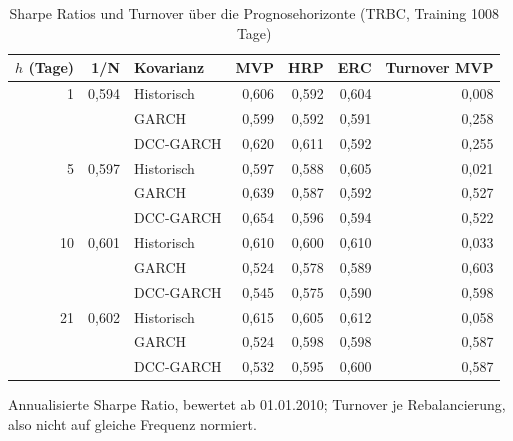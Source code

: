 \begin{table}[htbp]
  \centering
  \footnotesize
  \begin{tabular}{rrlrrrr}
    \toprule
    $h$ (Tage) & 1/N & Kovarianz & MVP & HRP & ERC & Turnover MVP \\
    \midrule
    1 & 0,594 & Historisch & 0,606 & 0,592 & 0,604 & 0,008 \\
     &  & GARCH & 0,599 & 0,592 & 0,591 & 0,258 \\
     &  & DCC-GARCH & 0,620 & 0,611 & 0,592 & 0,255 \\
    \midrule
    5 & 0,597 & Historisch & 0,597 & 0,588 & 0,605 & 0,021 \\
     &  & GARCH & 0,639 & 0,587 & 0,592 & 0,527 \\
     &  & DCC-GARCH & 0,654 & 0,596 & 0,594 & 0,522 \\
    \midrule
    10 & 0,601 & Historisch & 0,610 & 0,600 & 0,610 & 0,033 \\
     &  & GARCH & 0,524 & 0,578 & 0,589 & 0,603 \\
     &  & DCC-GARCH & 0,545 & 0,575 & 0,590 & 0,598 \\
    \midrule
    21 & 0,602 & Historisch & 0,615 & 0,605 & 0,612 & 0,058 \\
     &  & GARCH & 0,524 & 0,598 & 0,598 & 0,587 \\
     &  & DCC-GARCH & 0,532 & 0,595 & 0,600 & 0,587 \\
    \bottomrule
  \end{tabular}
  \caption{Sharpe Ratios und Turnover über die Prognosehorizonte (TRBC, Training 1008 Tage)}
  \label{tab:sharpe_horizont}
  \begin{minipage}{\linewidth}\vspace{0.4em}\centering\footnotesize
  Annualisierte Sharpe Ratio, bewertet ab 01.01.2010; Turnover je Rebalancierung, also nicht auf gleiche Frequenz normiert.
  \end{minipage}
\end{table}
